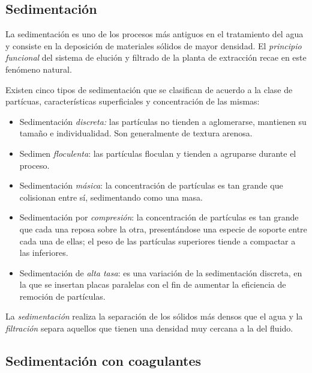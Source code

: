 \begin{center}
	\section{Sedimentaci\'on}
\end{center}

\noindent
\justify

La sedimentaci\'on es uno de los procesos m\'as antiguos en el tratamiento del agua y consiste en la deposici\'on de materiales s\'olidos de mayor densidad. El \textit{principio funcional} del sistema de eluci\'on y filtrado de la planta de extracci\'on recae en este fen\'omeno natural.

\noindent
\justify

Existen cinco tipos de sedimentaci\'on que se clasifican de acuerdo a  la clase de part\'icuas, caracter\'isticas superficiales y concentraci\'on de las mismas:

\begin{itemize}
	\item Sedimentaci\'on \textit{discreta:} las part\'iculas no tienden a aglomerarse, mantienen su tama\~no e individualidad. Son generalmente de textura arenosa.
	\item Sedimen \textit{floculenta}: las part\'iculas floculan y tienden a agruparse durante el proceso.
	\item Sedimentaci\'on \textit{m\'asica}: la concentraci\'on de part\'iculas es tan grande que colisionan entre s\'i, sedimentando como una masa.
	\item Sedimentaci\'on por \textit{compresi\'on}: la concentraci\'on de part\'iculas es tan grande que cada una reposa sobre la otra, present\'andose una especie de soporte entre cada una de ellas; el peso de las part\'iculas superiores tiende a compactar a las inferiores.
	\item Sedimentaci\'on de \textit{alta tasa}: es una variaci\'on de la sedimentaci\'on discreta, en la que se insertan placas paralelas con el fin de aumentar la eficiencia de remoci\'on de part\'iculas.
\end{itemize}

\noindent
\justify

La \textit{sedimentaci\'on} realiza la separaci\'on de los s\'olidos m\'as densos que el agua y la \textit{filtraci\'on} separa aquellos que tienen una densidad muy cercana a la del fluido.

\subsection{Sedimentaci\'on con coagulantes}

